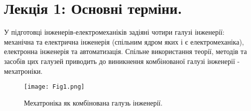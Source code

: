 \section{Лекція 1: Основні терміни. \label{chap1}}

У підготовці інженерів-електромеханіків задіяні чотири галузі інженерії: механічна та електрична інженерія (спільним ядром яких і є електромеханіка), електронна інженерія та автоматизація. Спільне використання теорії, методів та засобів цих галузей приводить до виникнення комбінованої галузі інженерії - мехатроніки.

\begin{figure}[h!]
	\texttt{[image: Fig1.png]}
	\centering
	\caption{Мехатроніка як комбінована галузь інженерії.}
\end{figure}